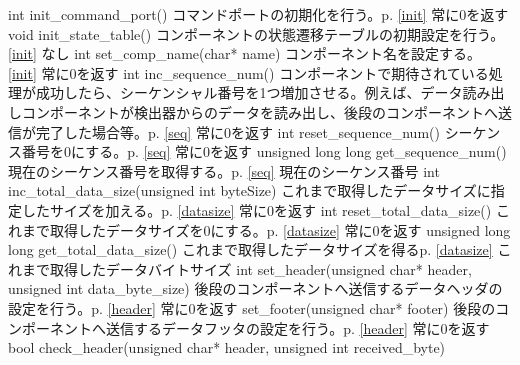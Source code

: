 \documentclass[a4j,10pt,dvips,onecolumn,oneside,final]{jarticle}%
\begin{document}
       {int init\_command\_port()} 
       {コマンドポートの初期化を行う。p.\pageref{init} \ref{init}} 
       {常に0を返す} 
       {}
       {void init\_state\_table()}
       {コンポーネントの状態遷移テーブルの初期設定を行う。\pageref{init} \ref{init}}
       {なし}
       {}
       {int set\_comp\_name(char{*} name)}
       {コンポーネント名を設定する。\pageref{init} \ref{init}}
       {常に0を返す}
       {}
       {int inc\_sequence\_num() }
       {コンポーネントで期待されている処理が成功したら、シーケンシャル番号を1つ増加させる。例えば、データ読み出しコンポーネントが検出器からのデータを読み出し、後段のコンポーネントへ送信が完了した場合等。p.\pageref{seq} \ref{seq}}
       {常に0を返す}
       {}
       {int reset\_sequence\_num() }
       {シーケンス番号を0にする。p.\pageref{seq} \ref{seq}}
       {常に0を返す}
       {}
       {unsigned long long get\_sequence\_num() }
       {現在のシーケンス番号を取得する。p.\pageref{seq} \ref{seq}}
       {現在のシーケンス番号}
       {}
       {int inc\_total\_data\_size(unsigned int byteSize)}
       {これまで取得したデータサイズに指定したサイズを加える。p.\pageref{datasize} \ref{datasize}}
       {常に0を返す}
       {}
       {int reset\_total\_data\_size() }
       {これまで取得したデータサイズを0にする。p.\pageref{datasize} \ref{datasize}}
       {常に0を返す}
       {}
       {unsigned long long get\_total\_data\_size() }
       {これまで取得したデータサイズを得るp.\pageref{datasize} \ref{datasize}}
       {これまで取得したデータバイトサイズ}
       {}
       {int set\_header(unsigned char{*} header, unsigned int data\_byte\_size) }
       {後段のコンポーネントへ送信するデータヘッダの設定を行う。p.\pageref{header} \ref{header}}
       {常に0を返す}
       {}
       {set\_footer(unsigned char{*} footer) }
       {後段のコンポーネントへ送信するデータフッタの設定を行う。p.\pageref{header} \ref{header}}
       {常に0を返す}
       {}
       {bool check\_header(unsigned char{*} header, unsigned int received\_byte) }
\end{document}
